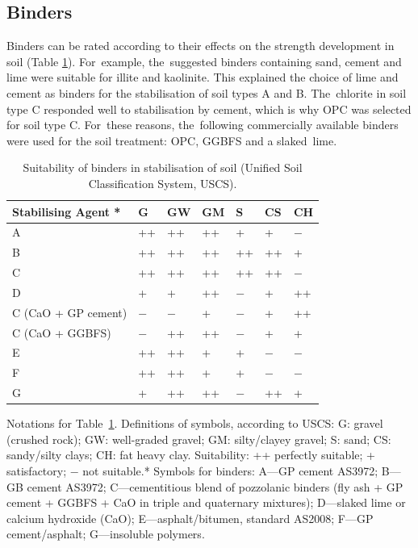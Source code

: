 \documentclass[electronics,article,accept,pdftex,moreauthors]{Definitions/mdpi}
\begin{document}
\subsection{Binders}
Binders can be rated according to their effects on the strength development in soil (Table \ref{tab:2}). For~example, the~suggested binders containing {sand, cement and lime were suitable  for illite and kaolinite}. This explained the choice of lime and cement as binders for the stabilisation of soil types A and B. The~chlorite{ }in soil type C responded well to{ stabilisation }by cement, which is why OPC was selected for soil type C. For~these reasons, the~following commercially available binders were used for the soil treatment: {OPC, GGBFS} and a slaked~lime. 

\begin{table}[H]\setlength{\tabcolsep}{6.13mm}
\caption{Suitability of binders in{ }stabilisation{ of }soil (Unified Soil Classification System, USCS).}\label{tab:2}
\small
    \begin{tabular}{@{}lllllll}
    \toprule
        \textbf{Stabilising Agent *} & \textbf{G} & \textbf{GW} & \textbf{GM} & \textbf{S} & \textbf{CS} & \textbf{CH} \\ \midrule
        A & ++ & ++ & ++ & + & + & $-$ \\ 
        B & ++ & ++ & ++ & ++ & ++ & + \\ 
        C & ++ & ++ & ++ & ++ & ++ & $-$ \\ 
        D & + & + & ++ & $-$ & + & ++ \\
        C (CaO + GP cement) & $-$ & $-$ & + & $-$ & + & ++ \\
        C (CaO + GGBFS) & $-$ & ++ & ++ & $-$ & + & + \\ 
        E & ++ & ++ & + & + & $-$ & $-$ \\ 
        F & ++ & ++ & + & + & $-$ & $-$ \\ 
        G & + & ++ & ++ & $-$ & ++ & + \\
\bottomrule
    \end{tabular} 
    
    \footnotesize{Notations for Table~\ref{tab:2}.  %
     Definitions of symbols, according to USCS: G: gravel (crushed rock); GW: well-graded gravel; GM: silty/clayey gravel; S: sand; CS: sandy/silty clays; CH: fat heavy clay. %
    {Suitability: ++ perfectly suitable; + satisfactory; $-$ not suitable.}* {Symbols for binders: A---GP cement AS3972; B---GB cement AS3972; C---cementitious blend of pozzolanic binders (fly ash + GP cement + GGBFS + CaO in triple and quaternary mixtures); D---slaked lime or calcium hydroxide (CaO); E---asphalt/bitumen, standard AS2008; F---GP cement/asphalt; G---insoluble polymers.} }
\end{table}
\unskip
\end{document}

